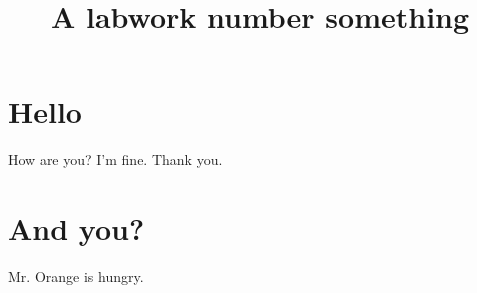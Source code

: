 \documentclass{report}
\begin{document}
\title{A labwork number something}
\maketitle
\section{Hello}
How are you? I'm fine. Thank you.
\section{And you?}
Mr. Orange is hungry.
\end{document}
